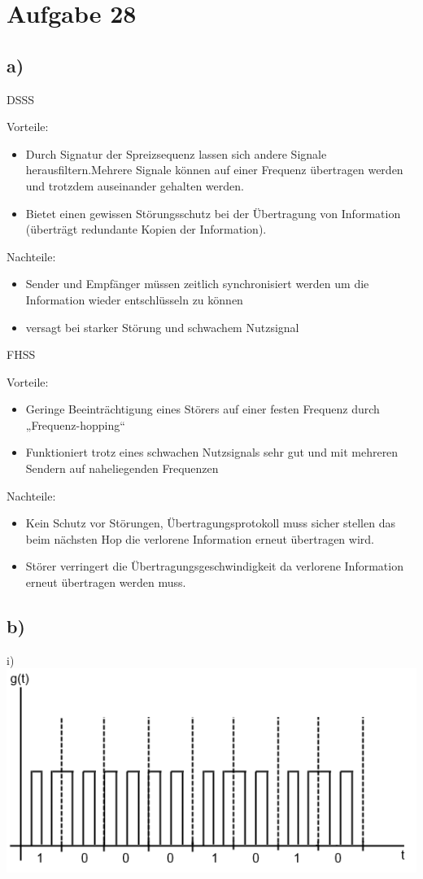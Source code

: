 \documentclass[a4paper,12pt]{scrartcl}
\begin{document}
\section{Aufgabe 28}
\subsection{a)}
DSSS

Vorteile:
\begin{itemize}
	\item Durch Signatur der Spreizsequenz lassen sich andere Signale herausfiltern.Mehrere Signale können auf einer Frequenz übertragen werden und trotzdem auseinander gehalten werden.
	\item Bietet einen gewissen Störungsschutz bei der Übertragung von Information (überträgt redundante Kopien der Information).
\end{itemize}
Nachteile:
\begin{itemize}
	\item Sender und Empfänger müssen zeitlich synchronisiert werden um die Information wieder entschlüsseln zu können
	\item versagt bei starker Störung und schwachem Nutzsignal
\end{itemize}

FHSS

Vorteile:
\begin{itemize}
	\item Geringe Beeinträchtigung eines Störers auf einer festen Frequenz durch „Frequenz-hopping“
	\item Funktioniert trotz eines schwachen Nutzsignals sehr gut und mit mehreren Sendern auf naheliegenden Frequenzen
\end{itemize}
Nachteile:
\begin{itemize}
	\item Kein Schutz vor Störungen, Übertragungsprotokoll muss sicher stellen das beim nächsten Hop die verlorene Information erneut übertragen wird.
	\item Störer verringert die Übertragungsgeschwindigkeit da verlorene Information erneut übertragen werden muss.
\end{itemize}
\subsection{b)}

i)
\includegraphics{./aufgabe28bi}
\end{document}
